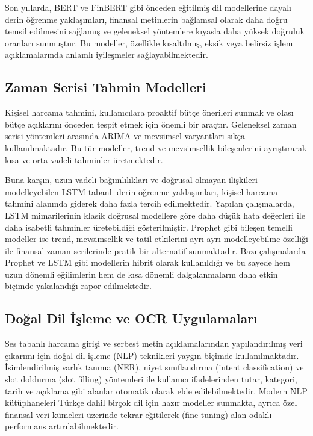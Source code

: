 Son yıllarda, BERT ve FinBERT gibi önceden eğitilmiş dil modellerine dayalı derin öğrenme yaklaşımları, finansal metinlerin bağlamsal olarak daha doğru temsil edilmesini sağlamış ve geleneksel yöntemlere kıyasla daha yüksek doğruluk oranları sunmuştur. Bu modeller, özellikle kısaltılmış, eksik veya belirsiz işlem açıklamalarında anlamlı iyileşmeler sağlayabilmektedir.

\subsection{Zaman Serisi Tahmin Modelleri}

Kişisel harcama tahmini, kullanıcılara proaktif bütçe önerileri sunmak ve olası bütçe açıklarını önceden tespit etmek için önemli bir araçtır. Geleneksel zaman serisi yöntemleri arasında ARIMA ve mevsimsel varyantları sıkça kullanılmaktadır. Bu tür modeller, trend ve mevsimsellik bileşenlerini ayrıştırarak kısa ve orta vadeli tahminler üretmektedir.

Buna karşın, uzun vadeli bağımlılıkları ve doğrusal olmayan ilişkileri modelleyebilen LSTM tabanlı derin öğrenme yaklaşımları, kişisel harcama tahmini alanında giderek daha fazla tercih edilmektedir. Yapılan çalışmalarda, LSTM mimarilerinin klasik doğrusal modellere göre daha düşük hata değerleri ile daha isabetli tahminler üretebildiği gösterilmiştir. Prophet gibi bileşen temelli modeller ise trend, mevsimsellik ve tatil etkilerini ayrı ayrı modelleyebilme özelliği ile finansal zaman serilerinde pratik bir alternatif sunmaktadır. Bazı çalışmalarda Prophet ve LSTM gibi modellerin hibrit olarak kullanıldığı ve bu sayede hem uzun dönemli eğilimlerin hem de kısa dönemli dalgalanmaların daha etkin biçimde yakalandığı rapor edilmektedir.

\subsection{Doğal Dil İşleme ve OCR Uygulamaları}

Ses tabanlı harcama girişi ve serbest metin açıklamalarından yapılandırılmış veri çıkarımı için doğal dil işleme (NLP) teknikleri yaygın biçimde kullanılmaktadır. İsimlendirilmiş varlık tanıma (NER), niyet sınıflandırma (intent classification) ve slot doldurma (slot filling) yöntemleri ile kullanıcı ifadelerinden tutar, kategori, tarih ve açıklama gibi alanlar otomatik olarak elde edilebilmektedir. Modern NLP kütüphaneleri Türkçe dahil birçok dil için hazır modeller sunmakta, ayrıca özel finansal veri kümeleri üzerinde tekrar eğitilerek (fine-tuning) alan odaklı performans artırılabilmektedir.

